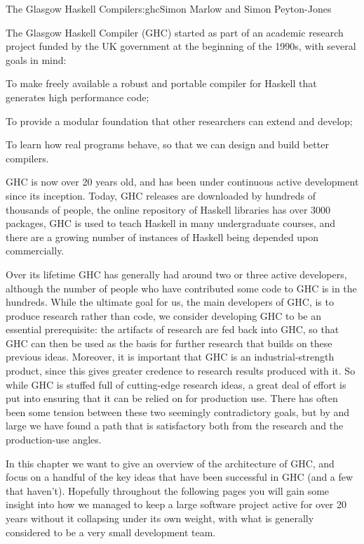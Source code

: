 \begin{aosachapter}{The Glasgow Haskell Compiler}{s:ghc}{Simon Marlow and Simon Peyton-Jones}

The Glasgow Haskell Compiler (GHC) started as part of an academic
research project funded by the UK government at the beginning of the
1990s, with several goals in mind:

\begin{aosaitemize}

\item To make freely available a robust and portable compiler for
  Haskell that generates high performance code;

\item To provide a modular foundation that other researchers can
  extend and develop;

\item To learn how real programs behave, so that we can design and
  build better compilers.

\end{aosaitemize}

GHC is now over 20 years old, and has been under continuous active
development since its inception.  Today, GHC releases are downloaded
by hundreds of thousands of people, the online repository of Haskell
libraries has over 3000 packages, GHC is used to teach Haskell in many
undergraduate courses, and there are a growing number of instances of
Haskell being depended upon commercially.

Over its lifetime GHC has generally had around two or three active
developers, although the number of people who have contributed some
code to GHC is in the hundreds.  While the ultimate goal for us, the
main developers of GHC, is to produce research rather than code, we
consider developing GHC to be an essential prerequisite: the artifacts
of research are fed back into GHC, so that GHC can then be used as the
basis for further research that builds on these previous ideas.
Moreover, it is important that GHC is an industrial-strength product,
since this gives greater credence to research results produced with
it.  So while GHC is stuffed full of cutting-edge research ideas, a
great deal of effort is put into ensuring that it can be relied on for
production use.  There has often been some tension between these two
seemingly contradictory goals, but by and large we have found a path
that is satisfactory both from the research and the production-use
angles.

In this chapter we want to give an overview of the architecture of
GHC, and focus on a handful of the key ideas that have been successful
in GHC (and a few that haven't).  Hopefully throughout the following
pages you will gain some insight into how we managed to keep a large
software project active for over 20 years without it collapsing under
its own weight, with what is generally considered to be a very small
development team.


\end{aosachapter}
